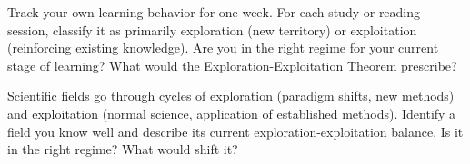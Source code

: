 \begin{exercise}
  Track your own learning behavior for one week. For each study or
  reading session, classify it as primarily exploration (new territory)
  or exploitation (reinforcing existing knowledge). Are you in the
  right regime for your current stage of learning? What would the
  Exploration-Exploitation Theorem prescribe?
\end{exercise}

\begin{exercise}
  Scientific fields go through cycles of exploration (paradigm shifts,
  new methods) and exploitation (normal science, application of
  established methods). Identify a field you know well and describe
  its current exploration-exploitation balance. Is it in the right
  regime? What would shift it?
\end{exercise}
